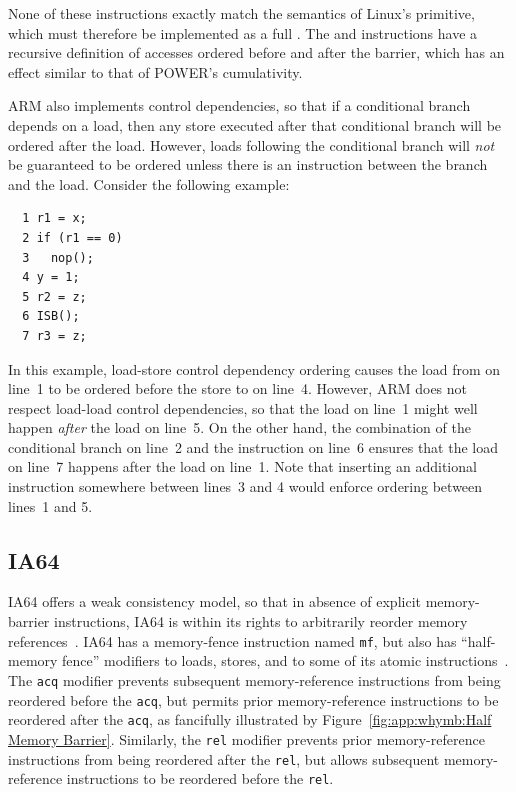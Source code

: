 None of these instructions exactly match the semantics of Linux's
 primitive, which must therefore be implemented as a full
.
The  and  instructions have a recursive definition
of accesses ordered before and after the barrier, which has an effect
similar to that of POWER's cumulativity.

ARM also implements control dependencies, so that if a conditional
branch depends on a load, then any store executed after that conditional
branch will be ordered after the load.
However, loads following the conditional branch will \emph{not}
be guaranteed to be ordered unless there is an 
instruction between the branch and the load.
Consider the following example:

\vspace{5pt}
\begin{minipage}[t]{\columnwidth}
\small
\begin{verbatim}
  1 r1 = x;
  2 if (r1 == 0)
  3   nop();
  4 y = 1;
  5 r2 = z;
  6 ISB();
  7 r3 = z;
\end{verbatim}
\end{minipage}
\vspace{5pt}

In this example, load-store control dependency ordering causes
the load from  on line~1 to be ordered before the store to
 on line~4.
However, ARM does not respect load-load control dependencies, so that
the load on line~1 might well happen \emph{after} the
load on line~5.
On the other hand, the combination of the conditional branch on line~2
and the  instruction on line~6 ensures that
the load on line~7 happens after the load on line~1.
Note that inserting an additional  instruction somewhere between
lines~3 and 4 would enforce ordering between lines~1 and 5.

\subsection{IA64}

IA64 offers a weak consistency model, so that in absence of explicit
memory-barrier instructions, IA64 is within its rights to arbitrarily
reorder memory references~\cite{IntelItanium02v2}.
IA64 has a memory-fence instruction named {\tt mf}, but also has
``half-memory fence'' modifiers to loads, stores, and to some of its atomic
instructions~\cite{IntelItanium02v3}.
The {\tt acq} modifier prevents subsequent memory-reference instructions
from being reordered before the {\tt acq}, but permits
prior memory-reference instructions to be reordered after the {\tt acq},
as fancifully illustrated by Figure~\ref{fig:app:whymb:Half Memory Barrier}.
Similarly, the {\tt rel} modifier prevents prior memory-reference
instructions from being reordered after the {\tt rel}, but allows
subsequent memory-reference instructions to be reordered before
the {\tt rel}.

